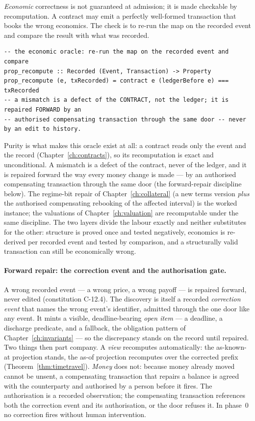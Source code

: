 \documentclass[11pt,a4paper]{article}
\begin{document}
\emph{Economic} correctness is not guaranteed at admission; it is made checkable by
recomputation. A contract may emit a perfectly well-formed transaction that books the wrong
economics. The check is to re-run the map on the recorded event and compare the result with
what was recorded.

\begin{lstlisting}
-- the economic oracle: re-run the map on the recorded event and compare
prop_recompute :: Recorded (Event, Transaction) -> Property
prop_recompute (e, txRecorded) = contract e (ledgerBefore e) === txRecorded
-- a mismatch is a defect of the CONTRACT, not the ledger; it is repaired FORWARD by an
-- authorised compensating transaction through the same door -- never by an edit to history.
\end{lstlisting}

Purity is what makes this oracle exist at all: a contract reads only the event and the
record (Chapter~\ref{ch:contracts}), so its recomputation is exact and unconditional. A
mismatch is a defect of the contract, never of the ledger, and it is repaired forward the way every
money change is made --- by an authorised compensating transaction through the same door
(the forward-repair discipline below). The regime-bit
repair of Chapter~\ref{ch:collateral} (a new terms version \emph{plus} the authorised compensating
rebooking of the affected interval) is the worked instance; the valuations of
Chapter~\ref{ch:valuation} are recomputable under the same discipline. The two layers
divide the labour exactly and neither substitutes for the other: structure is proved once
and tested negatively, economics is re-derived per recorded event and tested by comparison,
and a structurally valid transaction can still be economically wrong.

\paragraph{Forward repair: the correction event and the authorisation gate.}
A wrong recorded event --- a wrong price, a wrong payoff --- is repaired forward, never
edited (constitution C-12.4). The discovery is itself a recorded \emph{correction event}
that names the wrong event's identifier, admitted through the one door like any event. It
mints a visible, deadline-bearing \emph{open item} --- a deadline, a discharge predicate,
and a fallback, the obligation pattern of Chapter~\ref{ch:invariants} --- so the discrepancy
stands on the record until repaired. Two things then part company. A \emph{view} recomputes
automatically: the as-known-at projection stands, the as-of projection recomputes over the
corrected prefix (Theorem~\ref{thm:timetravel}). \emph{Money} does not: because money already
moved cannot be unsent, a compensating transaction that repairs a balance is agreed with the
counterparty and authorised by a person before it fires. The authorisation is a recorded
observation; the compensating transaction references both the correction event and its
authorisation, or the door refuses it. In phase~0 no correction fires without human
intervention.
\end{document}
